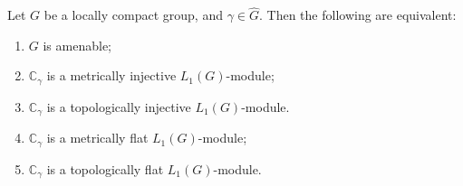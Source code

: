 \begin{proposition}\label{OneDimL1ModMetTopInjFlatCharac} Let $G$ be a locally
compact group, and $\gamma\in\widehat{G}$. Then the following are equivalent:

\begin{enumerate}[label = (\roman*)]
    \item $G$ is amenable;

    \item $\mathbb{C}_\gamma$ is a metrically injective $L_1(G)$-module;

    \item $\mathbb{C}_\gamma$ is a topologically injective $L_1(G)$-module.

    \item $\mathbb{C}_\gamma$ is a metrically flat $L_1(G)$-module;

    \item $\mathbb{C}_\gamma$ is a topologically flat $L_1(G)$-module.
\end{enumerate}
\end{proposition}
